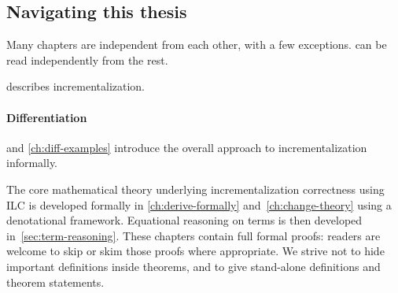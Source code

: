 



\subsection{Navigating this thesis}
Many chapters are independent from each other, with a few exceptions.
 can be read independently from the rest.

 describes incrementalization.

\paragraph{Differentiation}
 and \cref{ch:diff-examples} introduce the overall approach to
incrementalization informally.

The core mathematical theory underlying incrementalization correctness using ILC
is developed formally in \cref{ch:derive-formally} and~\cref{ch:change-theory}
using a denotational framework. Equational reasoning on terms is then developed
in~\cref{sec:term-reasoning}. These chapters contain full formal proofs: readers
are welcome to skip or skim those proofs where appropriate. We strive not to
hide important definitions inside theorems, and to give stand-alone definitions
and theorem statements.

